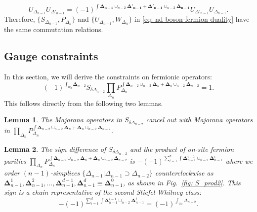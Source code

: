 \documentclass[12pt]{article}
\newtheorem{lemma}{Lemma}
\begin{document}
\begin{equation}
    U_{\Delta_{n-1}} U_{\Delta'_{n-1}} = (-1)^{\int \boldsymbol {\Delta_{n-1}} \cup_{n-2} \boldsymbol {\Delta'_{n-1}}  + \boldsymbol {\Delta'_{n-1}} \cup_{n-2} \boldsymbol {\Delta_{n-1}} } U_{\Delta'_{n-1}} U_{\Delta_{n-1}}.
\label{eq: commutation relation of bosonic hopping}
\end{equation}
Therefore, $\{S_{\Delta_{n-1}}, P_{\Delta_n} \}$ and $\{U_{\Delta_{n-1}}, W_{\Delta_n} \}$ in \eqref{eq: nd boson-fermion duality} have the same commutation relations.

\subsection{Gauge constraints}

In this section, we will derive the constraints on fermionic operators:
\begin{equation}
     (-1)^{\int_{w_2} \boldsymbol \Delta_{n-2}} S_{\delta {\Delta_{n-2}}} \prod_{{\Delta_{n}}} P_{\Delta_{n}}^{\int \boldsymbol \Delta_{n-2} \cup_{n-2} \boldsymbol \Delta_{n} + \boldsymbol \Delta_{n} \cup_{n-2} \boldsymbol \Delta_{n-2}} = 1.
\end{equation}
This follows directly from the following two lemmas.

\begin{lemma}
    The Majorana operators in $S_{\delta {\Delta_{n-2}}}$ cancel out with Majorana operators in $\prod_{{\Delta_{n}}} P_{\Delta_{n}}^{\int \boldsymbol \Delta_{n-2} \cup_{n-2} \boldsymbol \Delta_{n} + \boldsymbol \Delta_{n} \cup_{n-2} \boldsymbol \Delta_{n-2}}$.
\label{lemma: S P cancel}
\end{lemma}

\begin{lemma}
    The sign difference of $S_{\delta {\Delta_{n-2}}}$ and the product of on-site fermion parities $\prod_{{\Delta_{n}}} P_{\Delta_{n}}^{\int \boldsymbol \Delta_{n-2} \cup_{n-2} \boldsymbol \Delta_{n} + \boldsymbol \Delta_{n} \cup_{n-2} \boldsymbol \Delta_{n-2}}$ is $-(-1)^{\sum^d_{i=1} \int \boldsymbol \Delta^{i-1}_{n-1} \cup_{n-2} \boldsymbol \Delta^{i}_{n-1} }$ where we order $(n-1)$-simplices $\{ \Delta_{n-1} | \Delta_{n-1} \supset {\Delta_{n-2}} \}$ counterclockwise as  $\boldsymbol \Delta^1_{n-1}, \boldsymbol \Delta^2_{n-1}, \dots, \boldsymbol\Delta^{d-1}_{n-1}, \boldsymbol\Delta^d_{n-1} \equiv \boldsymbol\Delta^0_{n-1}$, as shown in Fig.~\ref{fig: S_prod2}. This sign is a chain representative of the second Stiefel-Whitney class:
    \begin{equation}
        -(-1)^{\sum^d_{i=1} \int \boldsymbol \Delta^{i-1}_{n-1} \cup_{n-2} \boldsymbol \Delta^{i}_{n-1} } = (-1)^{\int_{w_2} \Delta_{n-2} }.
    \label{eq: S P sign}
    \end{equation}
\label{lemma: S P sign}
\end{lemma}
\end{document}
